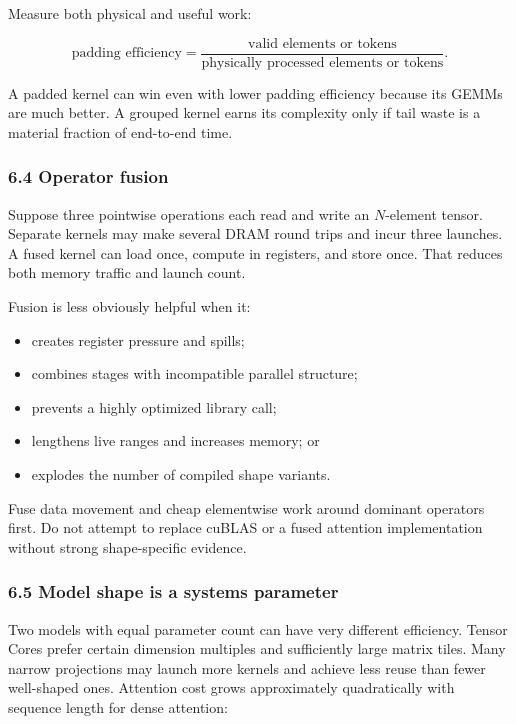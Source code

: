 \documentclass[
  10pt,
  letterpaper,
]{article}
\providecommand{\tightlist}{%
  \setlength{\itemsep}{0pt}\setlength{\parskip}{0pt}}
\begin{document}
Measure both physical and useful work:

\[
\text{padding efficiency}
=\frac{\text{valid elements or tokens}}{\text{physically processed elements or tokens}}.
\]

A padded kernel can win even with lower padding efficiency because its
GEMMs are much better. A grouped kernel earns its complexity only if
tail waste is a material fraction of end-to-end time.

\subsubsection{6.4 Operator fusion}\label{64-operator-fusion}

Suppose three pointwise operations each read and write an \(N\)-element
tensor. Separate kernels may make several DRAM round trips and incur
three launches. A fused kernel can load once, compute in registers, and
store once. That reduces both memory traffic and launch count.

Fusion is less obviously helpful when it:

\begin{itemize}
\tightlist
\item
  creates register pressure and spills;
\item
  combines stages with incompatible parallel structure;
\item
  prevents a highly optimized library call;
\item
  lengthens live ranges and increases memory; or
\item
  explodes the number of compiled shape variants.
\end{itemize}

Fuse data movement and cheap elementwise work around dominant operators
first. Do not attempt to replace cuBLAS or a fused attention
implementation without strong shape-specific evidence.

\subsubsection{6.5 Model shape is a systems
parameter}\label{65-model-shape-is-a-systems-parameter}

Two models with equal parameter count can have very different
efficiency. Tensor Cores prefer certain dimension multiples and
sufficiently large matrix tiles. Many narrow projections may launch more
kernels and achieve less reuse than fewer well-shaped ones. Attention
cost grows approximately quadratically with sequence length for dense
attention:
\end{document}
